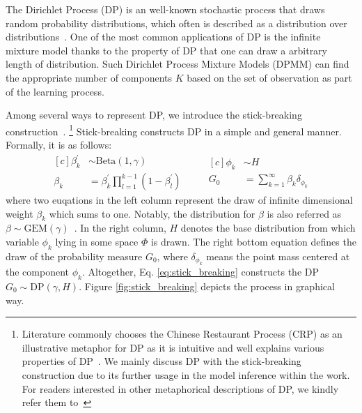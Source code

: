 \documentclass{article}
\begin{document}
The Dirichlet Process (DP) is an well-known stochastic process that draws random probability distributions, which often is described as a distribution over distributions~\cite{DBLP:reference/ml/Teh17}. One of the most common applications of DP is the infinite mixture model thanks to the property of DP that one can draw a arbitrary length of distribution. Such Dirichlet Process Mixture Models (DPMM) can find the appropriate number of components $K$ based on the set of observation as part of the learning process.

Among several ways to represent DP, we introduce the stick-breaking construction~\cite{sethuraman94}.
\footnote{Literature commonly chooses the Chinese Restaurant Process (CRP) as an illustrative metaphor for DP as it is intuitive and well explains various properties of DP~\cite{DBLP:reference/ml/Teh17}. We mainly discuss DP with the stick-breaking construction due to its further usage in the model inference within the work. For readers interested in other metaphorical descriptions of DP, we kindly refer them to~\cite{DBLP:reference/ml/Teh17, DBLP:conf/ismir/HoffmanBC08}}
Stick-breaking constructs DP in a simple and general manner. Formally, it is as follows:
\begin{equation}\label{eq:stick_breaking}
\begin{aligned}[c]
    \beta^{\prime}_{k} &\sim \text{Beta}(1, \gamma) \\
    \beta_{k} &= \beta^{\prime}_{k} \prod_{l=1}^{k-1} (1 - \beta_{l}^{\prime})
\end{aligned}
\qquad
\begin{aligned}[c]
    \phi_{k} &\sim H \\
    G_{0} &= \sum^{\infty}_{k=1} \beta_{k}\delta_{\phi_{k}}
\end{aligned}
\end{equation}
where two euqations in the left column represent the draw of infinite dimensional weight $\beta_{k}$ which sums to one. Notably, the distribution for $\beta$ is also referred as $\beta \sim \text{GEM}(\gamma)$~\cite{DBLP:journals/cpc/Pitman02}. In the right column, $H$ denotes the base distribution from which variable $\phi_{k}$ lying in some space $\Phi$ is drawn. The right bottom equation defines the draw of the probability measure $G_{0}$, where $\delta_{\phi_{k}}$ means the point mass centered at the component $\phi_{k}$. Altogether, Eq. \ref{eq:stick_breaking} constructs the DP $G_{0} \sim \text{DP}(\gamma, H)$. Figure \ref{fig:stick_breaking} depicts the process in graphical way.
\end{document}
